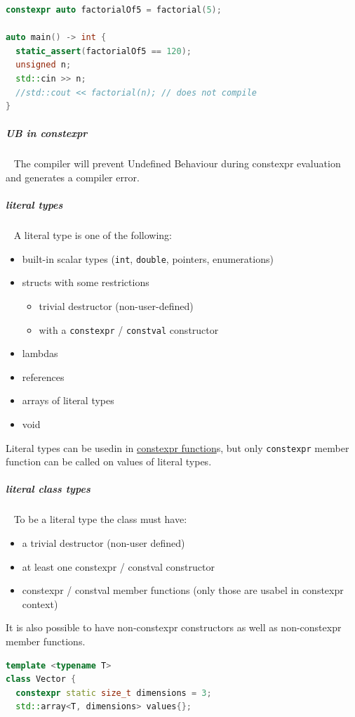 \documentclass[11pt,twoside,landscape]{article}
\begin{document}
\begin{multicols}{2}
\begin{lstlisting}[language=c++,label=lst:org61f01e6,caption={consteval example},captionpos=b,numbers=none]
constexpr auto factorialOf5 = factorial(5);

auto main() -> int {
  static_assert(factorialOf5 == 120);
  unsigned n;
  std::cin >> n;
  //std::cout << factorial(n); // does not compile
}
\end{lstlisting}

\subparagraph{UB in constexpr} \
\label{sec:orgdea334d}
The compiler will prevent Undefined Behaviour during constexpr evaluation and generates a compiler error.

\subparagraph{literal types} \
\label{sec:org5825adf}
A literal type is one of the following:
\begin{itemize}
\item built-in scalar types (\texttt{int}, \texttt{double}, pointers, enumerations)
\item structs with some restrictions
\begin{itemize}
\item trivial destructor (non-user-defined)
\item with a \texttt{constexpr} / \texttt{constval} constructor
\end{itemize}
\item lambdas
\item references
\item arrays of literal types
\item void
\end{itemize}


Literal types can be usedin in \href{../../../roam/20230629095751-what_are_constexpr_functions_in_cpp.org}{constexpr function}s, but only \texttt{constexpr} member function can be called on values of literal types.

\subparagraph{literal class types} \
\label{sec:org6c326fb}
To be a literal type the class must have:
\begin{itemize}
\item a trivial destructor (non-user defined)
\item at least one constexpr / constval constructor
\item constexpr / constval member functions (only those are usabel in constexpr context)
\end{itemize}


It is also possible to have non-constexpr constructors as well as non-constexpr member functions.

\begin{lstlisting}[language=c++,label=lst:org56ac3fd,caption={Example for a literal class type},captionpos=b,numbers=none]
template <typename T>
class Vector {
  constexpr static size_t dimensions = 3;
  std::array<T, dimensions> values{};


\end{lstlisting}
\end{multicols}
\end{document}
